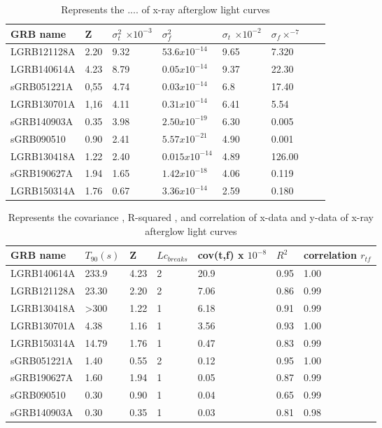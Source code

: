 \begin{center}
\begin{table}
\caption{\label{tab:"Table 4.2:"} Represents the .... of  x-ray afterglow   light curves  }
\begin{tabular}{|l|l|l|l|l|l|l|l|}
 \hline
 GRB name  &  Z & $ \sigma_{t}^{2} $ $\times10^{-3}$ & $ \sigma_{f}^{2} $ & $ \sigma_{t}$ $\times10^{-2}$ &  $ \sigma_{f} \times^{-7}$ \\ \hline
LGRB121128A&2.20& 9.32 &  $53.6x 10^{-14}$  & 9.65 &  7.320 \\ \hline
LGRB140614A& 4.23 & 8.79& $0.05x10^{-14}$ & 9.37&  22.30  \\ \hline
sGRB051221A& 0,55 & 4.74 & $0.03x10^{-14}$ &  6.8 & 17.40  \\ \hline
LGRB130701A& 1,16 & 4.11 & $0.31x10^{-14}$ &  6.41 & 5.54 \\ \hline
sGRB140903A& 0.35 & 3.98 & $2.50x10^{-19}$ & 6.30 & 0.005    \\ \hline
sGRB090510& 0.90  & 2.41 & $ 5.57x10^{-21}$ & 4.90 & 0.001   \\ \hline
LGRB130418A&1.22& 2.40 &  $0.015x10^{-14} $ & 4.89 & 126.00\\ \hline           
sGRB190627A& 1.94 & 1.65 & $1.42x10^{-18}$ & 4.06 &  0.119  \\ \hline 
LGRB150314A& 1.76 & 0.67 &$ 3.36x10^{-14}$ &  2.59 & 0.180  \\ \hline
\end{tabular}
\end{table}
\end{center}  
\begin{center}
\begin{table}
\begin{tabular}{|l|l|l|l|l|l|l|}
 \hline
 GRB name  & $T_{90}(s)$ & Z     & $Lc_{breaks}$ &  cov(t,f) x $10^{-8}$ &            $R^{2}$ & correlation   $  r_{tf} $\\ \hline
 LGRB140614A & 233.9 & 4.23  & 2 &  20.9 &0.95   &1.00   \\ \hline
 LGRB121128A & 23.30 & 2.20  & 2 &  7.06 &0.86   &0.99   \\ \hline
 LGRB130418A & >300  & 1.22  & 1 &  6.18 &0.91   &0.99   \\ \hline            
 LGRB130701A & 4.38  & 1.16  & 1 &  3.56 &0.93   &1.00   \\ \hline 
 LGRB150314A & 14.79 & 1.76  & 1 &  0.47 &0.83   &0.99   \\ \hline
 sGRB051221A & 1.40  & 0.55  & 2 &  0.12 &0.95   &1.00   \\ \hline 
 sGRB190627A & 1.60  & 1.94  & 1 &  0.05 &0.87   &0.99   \\ \hline
 sGRB090510  & 0.30  & 0.90  & 1 &  0.04 & 0.65  &0.99   \\ \hline 
 sGRB140903A & 0.30  & 0.35  & 1 &  0.03 & 0.81  &0.98   \\ \hline
\end{tabular}
\caption{\label{tab:"Table 4.3:"} Represents the  covariance  , R-squared , and  correlation  of  x-data  and  y-data  of  x-ray  afterglow  light  curves }
\end{table}
\end{center}    
